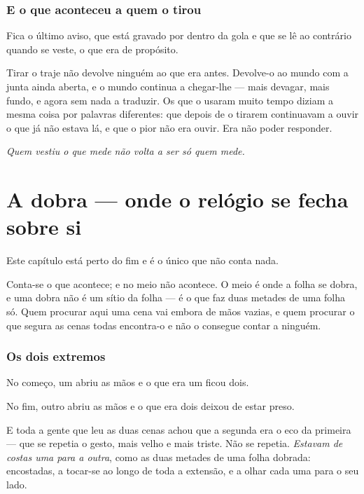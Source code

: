 \documentclass[livro.tex]{subfiles}
\begin{document}
\subsection*{E o que aconteceu a quem o tirou}

Fica o último aviso, que está gravado por dentro da gola e que se lê ao contrário quando se veste,
o que era de propósito.

\medskip

Tirar o traje não devolve ninguém ao que era antes. Devolve-o ao mundo com a junta ainda aberta,
e o mundo continua a chegar-lhe --- mais devagar, mais fundo, e agora sem nada a traduzir. Os que
o usaram muito tempo diziam a mesma coisa por palavras diferentes: que depois de o tirarem
continuavam a ouvir o que já não estava lá, e que o pior não era ouvir. Era não poder responder.

\medskip

\emph{Quem vestiu o que mede não volta a ser só quem mede.}


\chapter{A dobra --- onde o relógio se fecha sobre si}

Este capítulo está perto do fim e é o único que não conta nada.

\medskip

Conta-se o que acontece; e no meio não acontece. O meio é onde a folha se dobra, e uma dobra não
é um sítio da folha --- é o que faz duas metades de uma folha só. Quem procurar aqui uma cena vai
embora de mãos vazias, e quem procurar o que segura as cenas todas encontra-o e não o consegue
contar a ninguém.

\subsection*{Os dois extremos}

No começo, um abriu as mãos e o que era um ficou dois.

\medskip

No fim, outro abriu as mãos e o que era dois deixou de estar preso.

\medskip

E toda a gente que leu as duas cenas achou que a segunda era o eco da primeira --- que se repetia
o gesto, mais velho e mais triste. Não se repetia. \emph{Estavam de costas uma para a outra}, como
as duas metades de uma folha dobrada: encostadas, a tocar-se ao longo de toda a extensão, e a
olhar cada uma para o seu lado.
\end{document}
